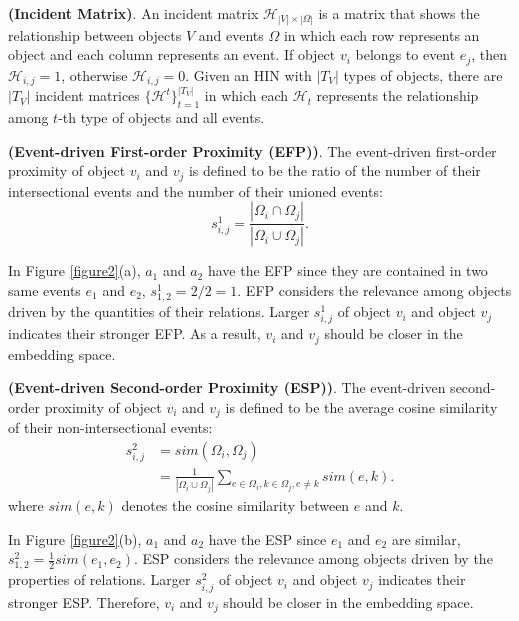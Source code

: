 \begin{mydef}
	\textbf{(Incident Matrix)}. An incident matrix $\mathcal{H}_{|V|\times|\Omega|}$ is a matrix that shows the relationship between objects $V$ and events $\Omega$ in which each row represents an object and each column represents an event. If object $v_i$ belongs to event $e_j$, then $\mathcal{H}_{i,j}=1$, otherwise $\mathcal{H}_{i,j}=0$. Given an HIN with $|T_V|$ types of objects, there are $|T_V|$ incident matrices $\{\mathcal{H}^t\}_{t=1}^{|T_V|}$ in which each $\mathcal{H}_t$ represents the relationship among $t$-th type of objects and all events.
\end{mydef}

\begin{mydef}
	\textbf{(Event-driven First-order Proximity (EFP))}. The event-driven first-order proximity of object $v_i$ and $v_j$ is defined to be the ratio of the number of their intersectional events and the number of their unioned events: 
	\begin{equation}\label{equation1}
	s_{i,j}^1 = \frac{|\Omega_i\cap\Omega_j|}{|\Omega_i\cup\Omega_j|}.
	\end{equation}
\end{mydef}

In Figure \ref{figure2}(a), $a_1$ and $a_2$ have the EFP since they are contained in two same events $e_1$ and $e_2$, $s^{1}_{1,2}=2/2=1$. EFP considers the relevance among objects driven by the quantities of their relations. Larger $s_{i,j}^1$ of object $v_i$ and object $v_j$ indicates their stronger EFP. As a result, $v_i$ and $v_j$ should be closer in the embedding space.

\begin{mydef}
	\textbf{(Event-driven Second-order Proximity (ESP))}. The event-driven second-order proximity of object $v_i$ and $v_j$ is defined to be the average cosine similarity of their non-intersectional events:
	\begin{equation}\label{equation2}
	\begin{aligned}
	s_{i,j}^2 &= sim(\Omega_i, \Omega_j) \\
	&= \frac{1}{|\Omega_i\cup\Omega_j|}\sum_{e\in\Omega_i,k\in\Omega_j,e\neq k}sim(e, k).
	\end{aligned}
	\end{equation}
	\noindent where $sim(e, k)$ denotes the cosine similarity between $e$ and $k$.
\end{mydef}

In Figure \ref{figure2}(b), $a_1$ and $a_2$ have the ESP since $e_1$ and $e_2$ are similar, $s^{2}_{1,2}=\frac{1}{2}sim(e_1, e_2)$. ESP considers the relevance among objects driven by the properties of relations. Larger $s_{i,j}^2$ of object $v_i$ and object $v_j$ indicates their stronger ESP. Therefore, $v_i$ and $v_j$ should be closer in the embedding space.

